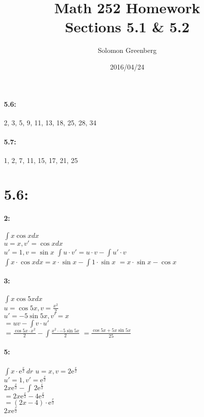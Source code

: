 \documentclass[12pt]{article}
\title{Math 252 Homework\\
\large Sections 5.1 \& 5.2}
\date{2016/04/24}
\author{Solomon Greenberg}
\newcommand{\me}{\mathrm{e}}
\begin{document}
    \newpage
    \paragraph*{5.6:} 2, 3, 5, 9, 11, 13, 18, 25, 28, 34
    \paragraph*{5.7:} 1, 2, 7, 11, 15, 17, 21, 25
    \section*{5.6:\\}
    \paragraph*{2:\\}
    $\int x \cos{x} dx$\\
    $u = x, v' = \cos{x}dx$\\
    $u' = 1, v = \sin{x}$
    $\int u\cdot v' = u \cdot v - \int u' \cdot v$\\
    $\int x\cdot\cos{x}dx = x\cdot \sin{x} - \int 1 \cdot \sin{x}$
    $= x\cdot \sin{x} - \cos{x}$\\

    \paragraph{3:\\}
    $\int x \cos{5x} dx$\\
    $u = \cos {5x}, v = \frac{x^2}{2}$\\
    $u' = -5\sin{5x}, v' = x$\\
    $= uv - \int{v \cdot u'}$\\
    $= \frac{\cos{5x}\cdot x^2}{2} - \int{\frac{x^2 \cdot -5\sin{5x}}{2}}$
    $= \frac{\cos{5x} + 5x\sin{5x}}{25}$\\ 

    \paragraph{5:\\}
    $\int \! x \cdot \me^{\frac{x}{2}} \, dr$
    $u = x, v = 2\me^{\frac{x}{2}}$\\
    $u' = 1, v' = \me^{\frac{x}{2}}$\\

    $2x\me^{\frac{x}{2}} - \int \, 2\me^{\frac{x}{2}}$\\
    $= 2x\me^{\frac{x}{2}} - 4\me^{\frac{x}{2}}$\\
    $= (2x - 4) \cdot \me^{\frac{x}{2}}$\\
    $2x\me^{\frac{x}{2}}$\\
\end{document}

